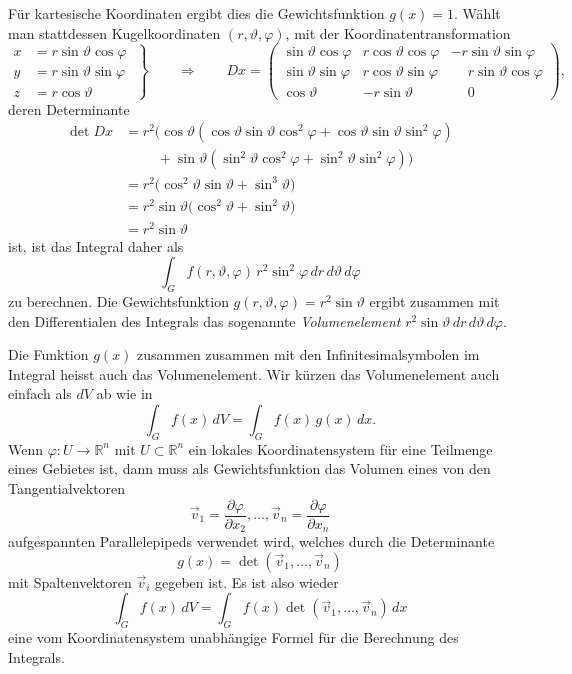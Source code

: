 Für kartesische Koordinaten ergibt dies die Gewichtsfunktion $g(x)=1$.
Wählt man stattdessen Kugelkoordinaten $(r,\vartheta,\varphi)$, mit der
Koordinatentransformation
\begin{equation}
\left.
\begin{aligned}
x&=r\sin\vartheta\cos\varphi\\
y&=r\sin\vartheta\sin\varphi\\
z&=r\cos\vartheta
\end{aligned}
\;\right\}
\qquad
\Rightarrow
\qquad
Dx
=
\begin{pmatrix}
\sin\vartheta\cos\varphi
	&  r \cos\vartheta\cos\varphi
		& -r\sin\vartheta\sin\varphi\\
\sin\vartheta\sin\varphi
	&  r \cos\vartheta\sin\varphi
		& \phantom{-}r\sin\vartheta\cos\varphi\\
\cos\vartheta
	& -r \sin\vartheta
		& \phantom{-}0
\end{pmatrix},
\end{equation}
deren Determinante
\begin{align*}
\det Dx
&=
r^2\bigl(
\cos\vartheta
(\cos\vartheta \sin\vartheta \cos^2\varphi
+
\cos\vartheta \sin\vartheta \sin^2\varphi
)
\\
&\phantom{=}
\quad
+
\sin\vartheta
(
\sin^2\vartheta \cos^2\varphi
+
\sin^2\vartheta \sin^2\varphi
)
\bigr)
\\
&=
r^2\bigl(
\cos^2\vartheta\sin\vartheta
+
\sin^3\vartheta
\bigr)
\\
&=
r^2
\sin\vartheta
\bigl(
\cos^2\vartheta
+
\sin^2\vartheta
\bigr)
\\
&=
r^2\sin\vartheta
\end{align*}
ist,
ist das Integral daher als
\[
\int_G f(r,\vartheta,\varphi)
\,
r^2\sin^2\varphi
\,dr\,d\vartheta\,d\varphi
\]
zu berechnen.
Die Gewichtsfunktion $g(r,\vartheta,\varphi)=r^2\sin\vartheta$ ergibt
zusammen mit den Differentialen des Integrals das sogenannte
{\em Volumenelement}
\(
r^2\sin\vartheta\,dr\,d\vartheta\,d\varphi
\).

Die Funktion $g(x)$ zusammen zusammen mit den Infinitesimalsymbolen
im Integral heisst auch das Volumenelement.
%
Wir kürzen das Volumenelement auch einfach als $dV$ ab wie in
\[
\int_G f(x) \,dV
=
\int_G f(x)\,g(x)\,dx.
\]
Wenn $\varphi\colon U\to\mathbb{R}^n$ mit $U\subset\mathbb{R}^n$ ein lokales
Koordinatensystem für eine Teilmenge eines Gebietes ist, dann muss als
Gewichtsfunktion das Volumen eines von den Tangentialvektoren
\[
\vec{v}_1
=
\frac{\partial\varphi}{\partial x_2}
,\dots,
\vec{v}_n
=
\frac{\partial\varphi}{\partial x_n}
\]
aufgespannten Parallelepipeds verwendet wird, welches durch die Determinante
\[
g(x)
=
\det(\vec{v}_1,\dots,\vec{v}_n)
\]
mit Spaltenvektoren $\vec{v}_i$ gegeben ist.
Es ist also wieder
\[
\int_G f(x)\, dV
=
\int_G f(x) \det(\vec{v}_1,\dots,\vec{v}_n)\,dx
\]
eine vom Koordinatensystem unabhängige Formel für die Berechnung des
Integrals.

